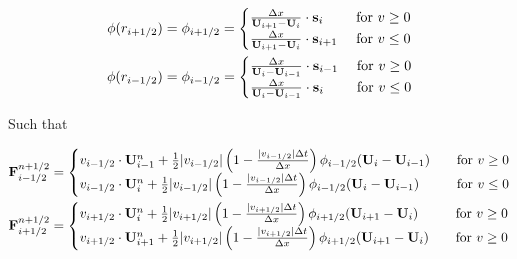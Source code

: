 \begin{align}
	\phi(r_{i+1/2}) &= \phi_{i+1/2} = 
		\begin{cases}
			\frac{\Delta x}{\mathbf{U}_{i+1} - \mathbf{U}_{i}} \cdot \mathbf{s}_{i} 	& 	\text{ for } v \geq 0 \\
			\frac{\Delta x}{\mathbf{U}_{i+1} - \mathbf{U}_{i}} \cdot \mathbf{s}_{i+1}	&	\text{ for } v \leq 0 \\
		\end{cases}
		\\
	\phi(r_{i-1/2}) &= \phi_{i-1/2} = 
		\begin{cases}
			\frac{\Delta x}{\mathbf{U}_i - \mathbf{U}_{i-1}} \cdot \mathbf{s}_{i-1} 	& 	\text{ for } v \geq 0 \\
			\frac{\Delta x}{\mathbf{U}_i - \mathbf{U}_{i-1}} \cdot \mathbf{s}_{i}	&	\text{ for } v \leq 0 \\
		\end{cases}
\end{align}


Such that

\begin{align*}
	\mathbf{F}_{i-1/2}^{n+1/2} &= 
		\begin{cases}
			v_{i-1/2} \cdot \mathbf{U}_{i-1}^n + \frac{1}{2} |v_{i-1/2}|  \left(1 -  \frac{|v_{i-1/2}| \Delta t}{\Delta x} \right) \phi_{i-1/2} ( \mathbf{U}_i - \mathbf{U}_{i-1} )
			 	& \quad \text{for } v \geq 0 \\
			v_{i-1/2} \cdot \mathbf{U}_{i}^n + \frac{1}{2} |v_{i-1/2}|  \left(1 -  \frac{|v_{i-1/2}| \Delta t}{\Delta x} \right) \phi_{i-1/2} ( \mathbf{U}_i - \mathbf{U}_{i-1} )
				& \quad \text{for } v \leq 0 \\
		\end{cases} \\		
	\mathbf{F}_{i+1/2}^{n+1/2} &= 
		\begin{cases}
			v_{i+1/2} \cdot \mathbf{U}_{i}^n + \frac{1}{2} |v_{i+1/2}|  \left(1 -  \frac{|v_{i+1/2}| \Delta t}{\Delta x} \right) \phi_{i+1/2} ( \mathbf{U}_{i+1} - \mathbf{U}_{i} )
			 	& \quad \text{for } v \geq 0 \\
			v_{i+1/2} \cdot \mathbf{U}_{i+1}^n + \frac{1}{2} |v_{i+1/2}|  \left(1 -  \frac{|v_{i+1/2}| \Delta t}{\Delta x} \right) \phi_{i+1/2} ( \mathbf{U}_{i+1} - \mathbf{U}_{i} )
			 	& \quad \text{for } v \geq 0 \\
		\end{cases} \\		
\end{align*}













